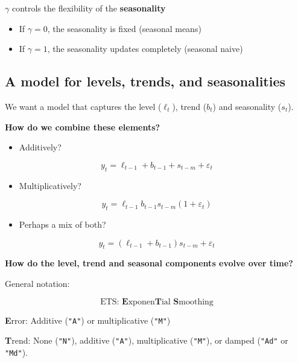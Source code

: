\documentclass[]{book}
\providecommand{\tightlist}{%
  \setlength{\itemsep}{0pt}\setlength{\parskip}{0pt}}
\begin{document}
\(\gamma\) controls the flexibility of the \textbf{seasonality}

\begin{itemize}
\tightlist
\item
  If \(\gamma = 0\), the seasonality is fixed (seasonal means)
\item
  If \(\gamma = 1\), the seasonality updates completely (seasonal naive)
\end{itemize}

\hypertarget{a-model-for-levels-trends-and-seasonalities}{%
\subsection{A model for levels, trends, and seasonalities}\label{a-model-for-levels-trends-and-seasonalities}}

We want a model that captures the level (\(\ell_t\)), trend (\(b_t\)) and seasonality (\(s_t\)).

\textbf{How do we combine these elements?}

\begin{itemize}
\tightlist
\item
  Additively?
\end{itemize}

\[y_t = \ell_{t-1} + b_{t-1} + s_{t-m} + \varepsilon_t\]

\begin{itemize}
\tightlist
\item
  Multiplicatively?
\end{itemize}

\[y_t = \ell_{t-1}b_{t-1}s_{t-m}(1 + \varepsilon_t)\]

\begin{itemize}
\tightlist
\item
  Perhaps a mix of both?
\end{itemize}

\[y_t = (\ell_{t-1} + b_{t-1}) s_{t-m} + \varepsilon_t\]

\textbf{How do the level, trend and seasonal components evolve over time?}

General notation:

\[\text{ETS: } \textbf{E}\text{xponen}\textbf{T}\text{ial}\textbf{ S}\text{moothing}\]

\textbf{E}rror: Additive (\texttt{"A"}) or multiplicative (\texttt{"M"})

\textbf{T}rend: None (\texttt{"N"}), additive (\texttt{"A"}), multiplicative (\texttt{"M"}), or damped (\texttt{"Ad"} or \texttt{"Md"}).
\end{document}
